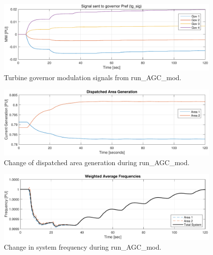 \begin{figure}[H]
	\centering
	\footnotesize
	\includegraphics[width=\linewidth]{examples/agcMod/agcModSig02}
	\caption{Turbine governor modulation signals from run\_AGC\_mod.}
	\label{fig: AGCmod tg sig}
\end{figure}%

\begin{figure}[H]
	\centering
	\footnotesize
	\includegraphics[width=\linewidth]{examples/agcMod/agcModSig03}
	\caption{Change of dispatched area generation during run\_AGC\_mod.}
	\label{fig: AGCmod area gen}
\end{figure}%

\begin{figure}[H]
	\centering
	\footnotesize
	\includegraphics[width=\linewidth]{examples/agcMod/agcModSig04}
	\caption{Change in system frequency during run\_AGC\_mod.}
	\label{fig: AGCmod change in gen}
\end{figure}%

\pagebreak



